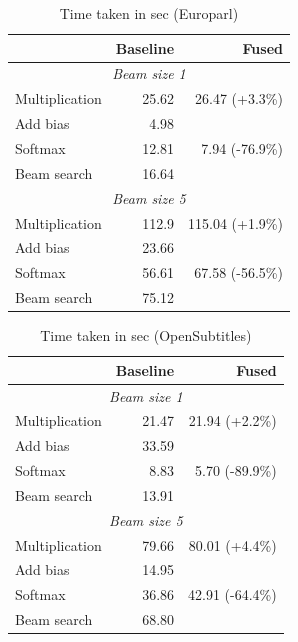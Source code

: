 \documentclass[11pt,a4paper]{article}
\begin{document}
\begin{table}
\begin{center}
\small
\begin{tabular}{|l|r|r|} \hline
		& Baseline	& Fused \\ \hline
\multicolumn{3}{|c|}{\emph{Beam size 1}}	\\ \hline	
Multiplication 	& 25.62 	& 26.47 (+3.3\%) \\ \hline
Add bias 	& 4.98		&  \\ 
Softmax 	& 12.81		& 7.94 (-76.9\%)\\
Beam search	& 16.64		&  \\ \hline
\multicolumn{3}{|c|}{\emph{Beam size 5}}	\\ \hline	
Multiplication 	& 112.9 	& 115.04 (+1.9\%) \\ \hline
Add bias 	& 23.66		&  \\ 
Softmax 	& 56.61		& 67.58 (-56.5\%)\\
Beam search	& 75.12		&  \\ \hline
\end{tabular}
\end{center}
\caption{Time taken in sec (Europarl)}
\label{tab:fused-breakdown-europarl}
\end{table}

\begin{table}
\begin{center}
\small
\begin{tabular}{|l|r|r|} \hline
		& Baseline	& Fused \\ \hline
\multicolumn{3}{|c|}{\emph{Beam size 1}}	\\ \hline	
Multiplication 	& 21.47 	& 21.94 (+2.2\%) \\ \hline
Add bias 	& 33.59		&  \\ 
Softmax 	& 8.83		& 5.70 (-89.9\%)\\
Beam search	& 13.91		&  \\ \hline
\multicolumn{3}{|c|}{\emph{Beam size 5}}	\\ \hline	
Multiplication 	& 79.66 	& 80.01 (+4.4\%) \\ \hline
Add bias 	& 14.95		&  \\ 
Softmax 	& 36.86		& 42.91 (-64.4\%)\\
Beam search	& 68.80		&  \\ \hline
\end{tabular}
\end{center}
\caption{Time taken in sec (OpenSubtitles)}
\label{tab:fused-breakdown-opensubtitles}
\end{table}
\end{document}
